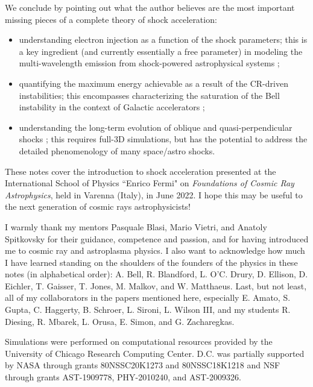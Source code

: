 \documentclass[varenna]{cimento}
\begin{document}
We conclude by pointing out what the author believes are the most important missing pieces of a complete theory of shock acceleration:
\begin{itemize}
    \item understanding electron injection as a function of the shock parameters; this is a key ingredient (and currently essentially a free parameter) in modeling the multi-wavelength emission from shock-powered astrophysical systems \cite{corso+23};
    \item quantifying the maximum energy achievable as a result of the CR-driven instabilities; this encompasses characterizing the saturation of the Bell instability \cite{bell04,zacharegkas+22} in the context of Galactic accelerators \cite{bell+13,blasi+15,cristofari+21,cristofari+22};
    \item understanding the long-term evolution of oblique and quasi-perpendicular shocks \cite{orusa+23}; this requires full-3D simulations, but has the potential to address the detailed phenomenology of many space/astro shocks.
\end{itemize}






\acknowledgments
These notes cover the introduction to shock acceleration presented at the International School of Physics ``Enrico Fermi" on \emph{Foundations of Cosmic Ray Astrophysics}, held in Varenna (Italy), in June 2022.
I hope this may be useful to the next generation of cosmic rays astrophysicists!


I warmly thank my mentors Pasquale Blasi, Mario Vietri, and Anatoly Spitkovsky for their guidance, competence and passion, and for having introduced me to cosmic ray and astroplasma physics. 
I also want to acknowledge how much I have learned standing on the shoulders of the founders of the physics in these notes (in alphabetical order): A. Bell, R. Blandford, L. O'C. Drury,  D. Ellison, D. Eichler, T. Gaisser, T. Jones, M. Malkov, and W. Matthaeus. 
Last, but not least, all of my collaborators in the papers mentioned here, especially E. Amato, S. Gupta, C. Haggerty,  B. Schroer, L. Sironi, L. Wilson III, and my students R. Diesing,  R. Mbarek, L. Orusa, E. Simon, and G. Zacharegkas.


Simulations were performed on computational resources provided by the University of Chicago Research Computing Center.
D.C. was partially supported by NASA through grants 80NSSC20K1273 and 80NSSC18K1218 and NSF through grants AST-1909778, PHY-2010240, and AST-2009326.





\end{document}
